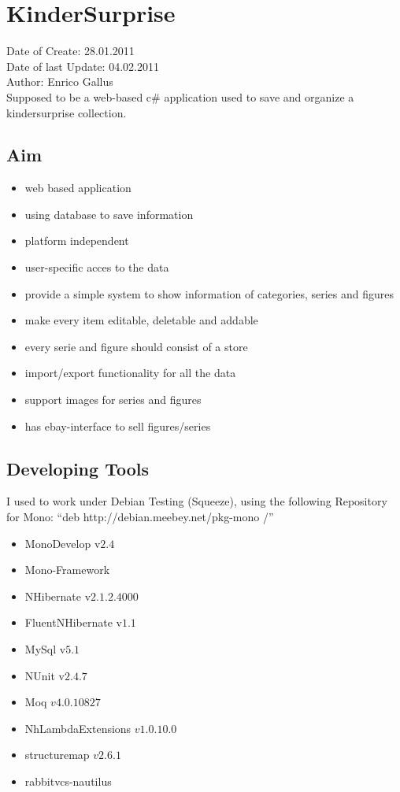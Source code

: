 \documentclass{article}
\begin{document}
\tableofcontents

\newpage

\section*{KinderSurprise}

Date of Create: 28.01.2011\\
Date of last Update: 04.02.2011\\
Author: Enrico Gallus\\

Supposed to be a web-based c\# application used to save and organize a
kindersurprise collection. 
\subsection{Aim}
\begin{itemize}
  \item web based application
  \item using database to save information
  \item platform independent
  \item user-specific acces to the data
  \item provide a simple system to show information of categories, series and
  figures
  \item make every item editable, deletable and addable
  \item every serie and figure should consist of a store
  \item import/export functionality for all the data
  \item support images for series and figures
  \item has ebay-interface to sell figures/series
\end{itemize}

\subsection{Developing Tools}
I used to work under Debian Testing (Squeeze), using the following Repository
for Mono: ``deb http://debian.meebey.net/pkg-mono /''

\begin{itemize}
  \item MonoDevelop v$2.4$
  \item Mono-Framework
  \item NHibernate v$2.1.2.4000$
  \item FluentNHibernate v$1.1$
  \item MySql v$5.1$
  \item NUnit v$2.4.7$
  \item Moq $v4.0.10827$
  \item NhLambdaExtensions $v1.0.10.0$
  \item structuremap $v2.6.1$
  \item rabbitvcs-nautilus
\end{itemize}
\end{document}
